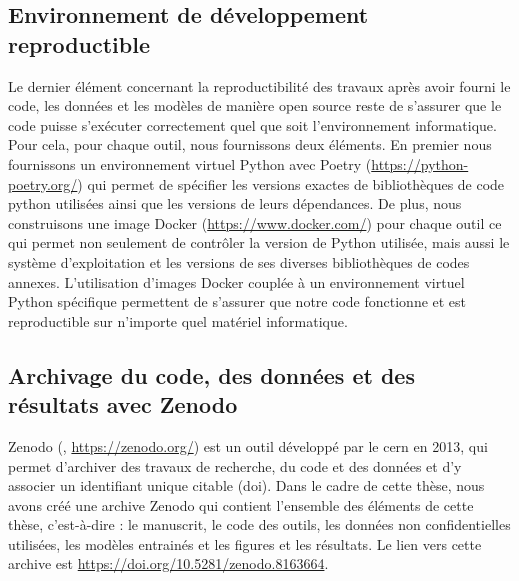 \subsection{Environnement de développement reproductible}
Le dernier élément concernant la reproductibilité des travaux après avoir fourni le code, les données et les modèles de manière open source reste de s'assurer que le code puisse s'exécuter correctement quel que soit l'environnement informatique. Pour cela, pour chaque outil, nous fournissons deux éléments. En premier nous fournissons un environnement virtuel Python avec Poetry (\url{https://python-poetry.org/}) qui permet de spécifier les versions exactes de bibliothèques de code python utilisées ainsi que les versions de leurs dépendances. De plus, nous construisons une image Docker (\url{https://www.docker.com/}) pour chaque outil ce qui permet non seulement de contrôler la version de Python utilisée, mais aussi le système d'exploitation et les versions de ses diverses bibliothèques de codes annexes. L'utilisation d'images Docker couplée à un environnement virtuel Python spécifique permettent de s'assurer que notre code fonctionne et est reproductible sur n'importe quel matériel informatique.

\subsection{Archivage du code, des données et des résultats avec Zenodo}
Zenodo (\cite{european_organization_for_nuclear_research_zenodo_2013}, \url{https://zenodo.org/}) est un outil développé par le \gls{cern} en 2013, qui permet d'archiver des travaux de recherche, du code et des données et d'y associer un identifiant unique citable (\gls{doi}). Dans le cadre de cette thèse, nous avons créé une archive Zenodo qui contient l'ensemble des éléments de cette thèse, c'est-à-dire : le manuscrit, le code des outils, les données non confidentielles utilisées, les modèles entrainés et les figures et les résultats. Le lien vers cette archive est \url{https://doi.org/10.5281/zenodo.8163664}.